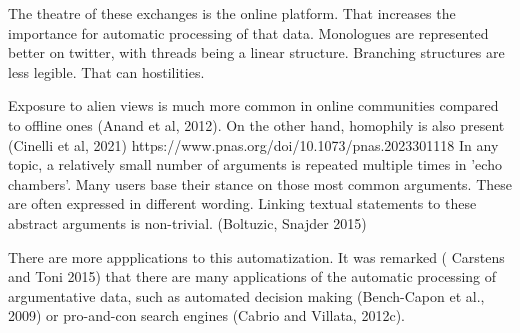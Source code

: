 

The theatre of these exchanges is the online platform.
That increases the importance for automatic processing of that data.
Monologues are represented better on twitter, with threads being a linear structure. Branching structures are less legible.
That can hostilities.

Exposure to alien views is much more common in online communities compared to offline ones (Anand et al, 2012).
On the other hand, homophily is also present (Cinelli et al, 2021) https://www.pnas.org/doi/10.1073/pnas.2023301118
In any topic, a relatively small number of arguments is repeated multiple times in 'echo chambers'.
Many users base their stance on those most common arguments. These are often expressed in different wording.
Linking textual statements to these abstract arguments is non-trivial. (Boltuzic, Snajder 2015)

There are more appplications to this automatization.
It was remarked ( Carstens and Toni 2015) that there are many applications of the automatic processing of argumentative data,
 such as automated decision making (Bench-Capon et al., 2009) or pro-and-con search engines (Cabrio and Villata, 2012c).